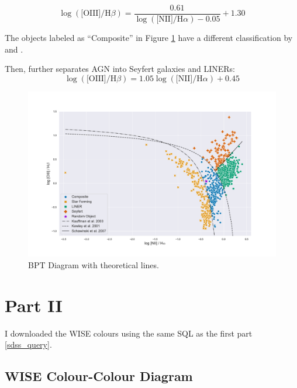 \documentclass[letterpaper, oneside]{article}
\begin{document}
\begin{equation} \label{kauffman}
	\log{ \left(  \text{[OIII]} / {\text{H}\beta} \right)  } = \frac{0.61}{\log{ \left( \text{[NII]} / {\text{H}\alpha} \right)  } - 0.05} + 1.30
\end{equation}

The objects labeled as ``Composite'' in Figure \ref{fig:BPT_line} have a different classification by \cite{Kewley_2001} and \cite{Kauffmann_2003}.

Then, \cite{Schawinski_2007} further separates AGN into Seyfert galaxies and LINERs:
\begin{equation} \label{shawinksi}
	\log{ \left( \text{[OIII]} / {\text{H}\beta}\right)  } = 1.05 \log{ \left(  \text{[NII]} / {\text{H}\alpha} \right)  } + 0.45
\end{equation}

\begin{figure}[h]
	\centering
	\includegraphics[width=1.1\textwidth]{../BPT_with_lines_and_random.pdf}
	\caption{BPT Diagram with theoretical lines.}
	\label{fig:BPT_line}
\end{figure}


\section{Part II}

I downloaded the WISE colours \cite{Wright_2010} using the same SQL as the first part \ref{sdss_query}.

\subsection{WISE Colour-Colour Diagram}
\end{document}
